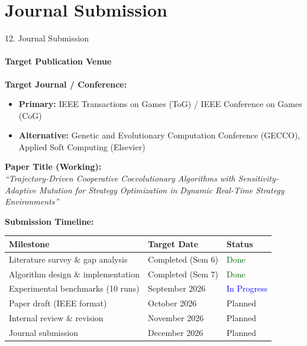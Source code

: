 \documentclass[aspectratio=169, 11pt]{beamer}
\begin{document}
\section{Journal Submission}
\begin{frame}{12. Journal Submission}
    \framesubtitle{Target Publication Venue}

    \textbf{\textcolor{amritaMaroon}{Target Journal / Conference:}} \\[0.15cm]
    \begin{itemize}\small
        \item \textbf{Primary:} IEEE Transactions on Games (ToG) / IEEE Conference on Games (CoG)
        \item \textbf{Alternative:} Genetic and Evolutionary Computation Conference (GECCO), Applied Soft Computing (Elsevier)
    \end{itemize}

    \vspace{0.3cm}
    \textbf{\textcolor{amritaMaroon}{Paper Title (Working):}} \\[0.1cm]
    {\small \textit{``Trajectory-Driven Cooperative Coevolutionary Algorithms with Sensitivity-Adaptive Mutation for Strategy Optimization in Dynamic Real-Time Strategy Environments''}}

    \vspace{0.3cm}
    \textbf{\textcolor{amritaMaroon}{Submission Timeline:}}
    \begin{table}
        \centering
        \footnotesize
        \renewcommand{\arraystretch}{1.1}
        \begin{tabular}{lll}
            \toprule
            \textbf{Milestone} & \textbf{Target Date} & \textbf{Status} \\
            \midrule
            Literature survey \& gap analysis & Completed (Sem 6) & \textcolor{darkGreen}{Done} \\
            Algorithm design \& implementation & Completed (Sem 7) & \textcolor{darkGreen}{Done} \\
            Experimental benchmarks (10 runs) & September 2026 & \textcolor{blue}{In Progress} \\
            Paper draft (IEEE format) & October 2026 & Planned \\
            Internal review \& revision & November 2026 & Planned \\
            Journal submission & December 2026 & Planned \\
            \bottomrule
        \end{tabular}
    \end{table}
\end{frame}
\end{document}
